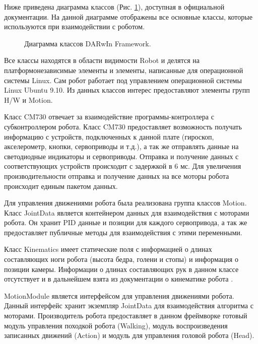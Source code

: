 Ниже приведена диаграмма классов (Рис. \ref{im:1_framework_class_diagram}), доступная в официальной документации\cite{urldarwinopemanual}. На данной диаграмме отображены все основные классы, которые используются при взаимодействии с роботом.

\begin{figure}[h]
\caption{Диаграмма классов DARwIn Framework.}
\label{im:1_framework_class_diagram}
\end{figure}

Все классы находятся в области видимости Robot и делятся на платформонезависимые элементы и элементы, написанные для операционной системы Linux. Сам робот работает под управлением операционной системы Linux Ubuntu 9.10. Из данных классов интерес предоставляют элементы групп H/W и Motion.

Класс CM730 отвечает за взаимодействие программы-контроллера с субконтроллером робота. Класс CM730 предоставляет возможность получать информацию с устройств, подключенных к данной плате (гироскоп, акселерометр, кнопки, сервоприводы и т.д.), а так же отправлять данные на светодиодные индикаторы и сервоприводы. Отправка и получение данных с соответствующих устройств происходит с задержкой в 6 мс. Для увеличения производительности отправка и получение данных на все моторы робота происходит единым пакетом данных.

Для управления движениями робота была реализована группа классов Motion. Класс JointData является контейнером данных для взаимодействия с моторами робота. Он хранит PID данные и позиции для каждого сервопривода, а так же предоставляет публичные методы для взаимодействия с этими переменными.

Класс Kinematics имеет статические поля с информацией о длинах составляющих ноги робота (высота бедра, голени и стопы) и информация о позиции камеры. Информации о длинах составляющих рук в данном классе отсутствует и в дальнейшем взята из документации о кинематике робота \cite{williams2012darwin}.

MotionModule является интерфейсом для управления движениями робота. Данный интерфейс хранит экземпляр JointData для взаимодействия алгоритма с моторами. Производитель робота предоставляет в данном фреймворке готовый модуль управления походкой робота (Walking), модуль воспроизведения записанных движений (Action) и модуль для управления головой робота (Head).

